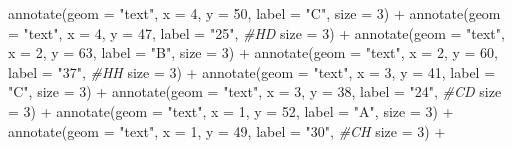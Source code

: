 \documentclass[
]{article}
\newenvironment{Shaded}{\begin{snugshade}}{\end{snugshade}}
\newcommand{\AttributeTok}[1]{\textcolor[rgb]{0.77,0.63,0.00}{#1}}
\newcommand{\CommentTok}[1]{\textcolor[rgb]{0.56,0.35,0.01}{\textit{#1}}}
\newcommand{\DecValTok}[1]{\textcolor[rgb]{0.00,0.00,0.81}{#1}}
\newcommand{\FunctionTok}[1]{\textcolor[rgb]{0.00,0.00,0.00}{#1}}
\newcommand{\NormalTok}[1]{#1}
\newcommand{\SpecialCharTok}[1]{\textcolor[rgb]{0.00,0.00,0.00}{#1}}
\newcommand{\StringTok}[1]{\textcolor[rgb]{0.31,0.60,0.02}{#1}}
\begin{document}
\begin{Shaded}
\begin{Highlighting}[]
  \FunctionTok{annotate}\NormalTok{(}\AttributeTok{geom =} \StringTok{"text"}\NormalTok{, }\AttributeTok{x =} \DecValTok{4}\NormalTok{, }\AttributeTok{y =} \DecValTok{50}\NormalTok{, }\AttributeTok{label =} \StringTok{"C"}\NormalTok{, }
           \AttributeTok{size =} \DecValTok{3}\NormalTok{) }\SpecialCharTok{+}
  \FunctionTok{annotate}\NormalTok{(}\AttributeTok{geom =} \StringTok{"text"}\NormalTok{, }\AttributeTok{x =} \DecValTok{4}\NormalTok{, }\AttributeTok{y =} \DecValTok{47}\NormalTok{, }\AttributeTok{label =} \StringTok{"25"}\NormalTok{, }\CommentTok{\#HD}
           \AttributeTok{size =} \DecValTok{3}\NormalTok{) }\SpecialCharTok{+}
  \FunctionTok{annotate}\NormalTok{(}\AttributeTok{geom =} \StringTok{"text"}\NormalTok{, }\AttributeTok{x =} \DecValTok{2}\NormalTok{, }\AttributeTok{y =} \DecValTok{63}\NormalTok{, }\AttributeTok{label =} \StringTok{"B"}\NormalTok{, }
           \AttributeTok{size =} \DecValTok{3}\NormalTok{) }\SpecialCharTok{+}
  \FunctionTok{annotate}\NormalTok{(}\AttributeTok{geom =} \StringTok{"text"}\NormalTok{, }\AttributeTok{x =} \DecValTok{2}\NormalTok{, }\AttributeTok{y =} \DecValTok{60}\NormalTok{, }\AttributeTok{label =} \StringTok{"37"}\NormalTok{, }\CommentTok{\#HH}
           \AttributeTok{size =} \DecValTok{3}\NormalTok{) }\SpecialCharTok{+}
  \FunctionTok{annotate}\NormalTok{(}\AttributeTok{geom =} \StringTok{"text"}\NormalTok{, }\AttributeTok{x =} \DecValTok{3}\NormalTok{, }\AttributeTok{y =} \DecValTok{41}\NormalTok{, }\AttributeTok{label =} \StringTok{"C"}\NormalTok{, }
           \AttributeTok{size =} \DecValTok{3}\NormalTok{) }\SpecialCharTok{+}
  \FunctionTok{annotate}\NormalTok{(}\AttributeTok{geom =} \StringTok{"text"}\NormalTok{, }\AttributeTok{x =} \DecValTok{3}\NormalTok{, }\AttributeTok{y =} \DecValTok{38}\NormalTok{, }\AttributeTok{label =} \StringTok{"24"}\NormalTok{, }\CommentTok{\#CD}
           \AttributeTok{size =} \DecValTok{3}\NormalTok{) }\SpecialCharTok{+}
  \FunctionTok{annotate}\NormalTok{(}\AttributeTok{geom =} \StringTok{"text"}\NormalTok{, }\AttributeTok{x =} \DecValTok{1}\NormalTok{, }\AttributeTok{y =} \DecValTok{52}\NormalTok{, }\AttributeTok{label =} \StringTok{"A"}\NormalTok{, }
           \AttributeTok{size =} \DecValTok{3}\NormalTok{) }\SpecialCharTok{+}
  \FunctionTok{annotate}\NormalTok{(}\AttributeTok{geom =} \StringTok{"text"}\NormalTok{, }\AttributeTok{x =} \DecValTok{1}\NormalTok{, }\AttributeTok{y =} \DecValTok{49}\NormalTok{, }\AttributeTok{label =} \StringTok{"30"}\NormalTok{, }\CommentTok{\#CH}
           \AttributeTok{size =} \DecValTok{3}\NormalTok{) }\SpecialCharTok{+}
  

\end{Highlighting}
\end{Shaded}
\end{document}

